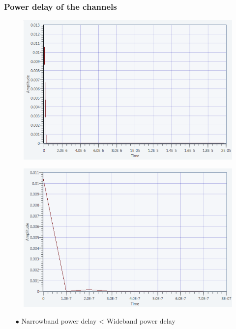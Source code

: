 \documentclass[11pt]{beamer}
\begin{document}
\begin{frame}
\frametitle{Power delay of the channels}

\begin{figure}[!ht]
    \begin{minipage}[b]{0.48\linewidth}
        \centering \includegraphics[scale=0.35]{img/power_delay_narrow.png}
     \label{fig4}
    \end{minipage}\hfill
    \begin{minipage}[b]{0.48\linewidth}
         \centering \includegraphics[scale=0.35]{img/power_delay_wideband.png}
    \end{minipage}
\end{figure}
\begin{itemize}
\item[$\bullet$] Narrowband power delay < Wideband power delay  
\end{itemize}
\end{frame}
\end{document}
